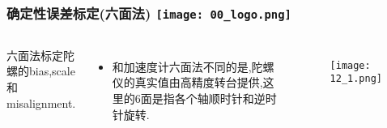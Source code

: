 \begin{comment}
\end{comment}
\begin{frame}
\frametitle{确定性误差标定(六面法) \hfill \texttt{[image: 00\_logo.png]}}
\begin{columns}
  
  六面法标定陀螺的bias,scale和misalignment.
  
  \begin{itemize}
    \item 和加速度计六面法不同的是,陀螺仪的真实值由高精度转台提供,这里的6面是指各个轴顺时针和逆时针旋转.
  \end{itemize}
  
	\begin{figure}[h]
		\texttt{[image: 12\_1.png]}
  \end{figure}
  

\end{columns}
\end{frame} 


